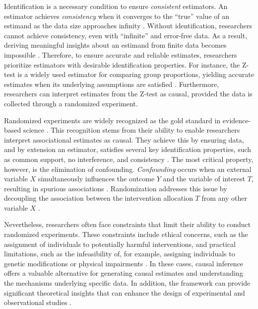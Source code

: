 \documentclass[
  authoryear,
  review,
  1p]{elsarticle}
\begin{document}
Identification is a necessary condition to ensure \emph{consistent}
estimators. An estimator achieves \emph{consistency} when it converges
to the ``true'' value of an estimand as the data size approaches
infinity \citep{Everitt_et_al_2010}. Without identification, researchers
cannot achieve consistency, even with ``infinite'' and error-free data.
As a result, deriving meaningful insights about an estimand from finite
data becomes impossible \citep[pp.~5]{Schuessler_et_al_2023}. Therefore,
to ensure accurate and reliable estimates, researchers prioritize
estimators with desirable identification properties. For instance, the
Z-test is a widely used estimator for comparing group proportions,
yielding accurate estimates when its underlying assumptions are
satisfied \citep{Kanji_2006}. Furthermore, researchers can interpret
estimates from the Z-test as causal, provided the data is collected
through a randomized experiment.

Randomized experiments are widely recognized as the gold standard in
evidence-based science \citep{Hariton_et_al_2018, Hansson_2014}. This
recognition stems from their ability to enable researchers interpret
associational estimates as causal. They achieve this by ensuring data,
and by extension an estimator, satisfies several key identification
properties, such as common support, no interference, and consistency
\citep{Morgan_et_al_2014, Neal_2020}. The most critical property,
however, is the elimination of confounding. \emph{Confounding} occurs
when an external variable \(X\) simultaneously influences the outcome
\(Y\) and the variable of interest \(T\), resulting in spurious
associations \citep{Everitt_et_al_2010}. Randomization addresses this
issue by decoupling the association between the intervention allocation
\(T\) from any other variable \(X\)
\citep{Morgan_et_al_2014, Neal_2020}.

Nevertheless, researchers often face constraints that limit their
ability to conduct randomized experiments. These constraints include
ethical concerns, such as the assignment of individuals to potentially
harmful interventions, and practical limitations, such as the
infeasibility of, for example, assigning individuals to genetic
modifications or physical impairments \citep{Neal_2020}. In these cases,
causal inference offers a valuable alternative for generating causal
estimates and understanding the mechanisms underlying specific data. In
addition, the framework can provide significant theoretical insights
that can enhance the design of experimental and observational studies
\citep{McElreath_2020}.
\end{document}
